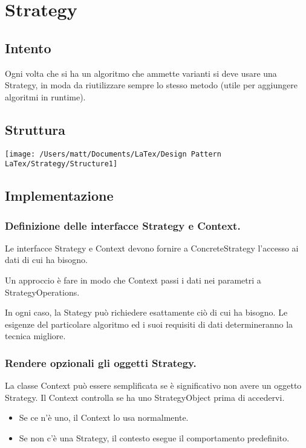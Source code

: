 \chapter{Strategy}
\section{Intento}

Ogni volta che si ha un algoritmo che ammette varianti si deve usare una Strategy, in moda da riutilizzare sempre lo stesso metodo (utile per aggiungere algoritmi in runtime).


\section{Struttura}

\texttt{[image: /Users/matt/Documents/LaTex/Design Pattern LaTex/Strategy/Structure1]}


\section{Implementazione}

\subsection{Definizione delle interfacce Strategy e Context.}
Le interfacce Strategy e Context devono fornire a ConcreteStrategy l'accesso ai dati di cui ha bisogno.

Un approccio è fare in modo che Context passi i dati nei parametri a StrategyOperations.

In ogni caso, la Stategy può richiedere esattamente ciò di cui ha bisogno. Le esigenze del particolare algoritmo ed i suoi requisiti di dati determineranno la tecnica migliore.

\subsection{Rendere opzionali gli oggetti Strategy.}
La classe Context può essere semplificata se è significativo non avere un oggetto Strategy. Il Context controlla se ha uno StrategyObject prima di accedervi.

\begin{itemize}
    \item Se ce n'è uno, il Context lo usa normalmente.

    \item Se non c'è una Strategy, il contesto esegue il comportamento predefinito.
\end{itemize}


